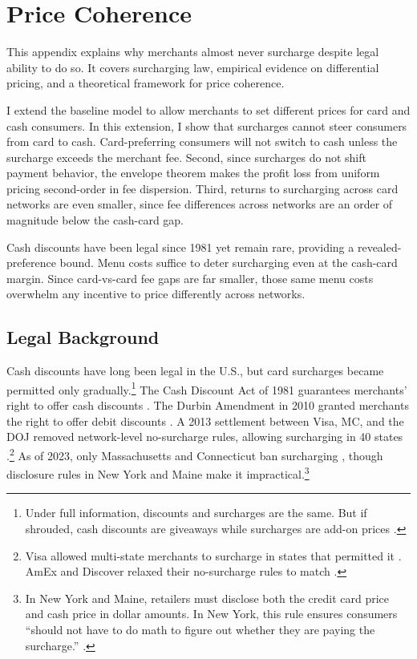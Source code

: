 \documentclass[main.tex]{subfiles}
\begin{document}
\section{Price Coherence}
\label{sec:oa-price-coherence}

This appendix explains why merchants almost never surcharge despite legal ability to do so.
It covers surcharging law, empirical evidence on differential pricing, and a theoretical framework for price coherence.

I extend the baseline model to allow merchants to set different prices for card and cash consumers.
In this extension, I show that surcharges cannot steer consumers from card to cash.
Card-preferring consumers will not switch to cash unless the surcharge exceeds the merchant fee.
Second, since surcharges do not shift payment behavior, the envelope theorem makes the profit loss from uniform pricing second-order in fee dispersion.
Third, returns to surcharging across card networks are even smaller, since fee differences across networks are an order of magnitude below the cash-card gap.

Cash discounts have been legal since 1981 yet remain rare, providing a revealed-preference bound.
Menu costs suffice to deter surcharging even at the cash-card margin.
Since card-vs-card fee gaps are far smaller, those same menu costs overwhelm any incentive to price differently across networks.

\subsection{Legal Background}
\label{subsec:oa-surcharging-history}

Cash discounts have long been legal in the U.S., but card surcharges became permitted only gradually.\footnote{Under full information, discounts and surcharges are the same. But if shrouded, cash discounts are giveaways while surcharges are add-on prices \parencite{Bourguignon.etal2019}.}
The Cash Discount Act of 1981 guarantees merchants' right to offer cash discounts \parencite{Chakravorti.Shah2001, Levitin2005, Prager.etal2009}.
The Durbin Amendment in 2010 granted merchants the right to offer debit discounts \parencite{Schuh.etal2011, Briglevics.Shy2014}.
A 2013 settlement between Visa, MC, and the DOJ removed network-level no-surcharge rules, allowing surcharging in 40 states \parencite{Blakeley.Fagan2015}.\footnote{Visa allowed multi-state merchants to surcharge in states that permitted it \parencite{Visa2013}.
AmEx and Discover relaxed their no-surcharge rules to match \parencite{Merchant2016}.}
As of 2023, only Massachusetts and Connecticut ban surcharging \parencite{CardX2023}, though disclosure rules in New York and Maine make it impractical.\footnote{In New York and Maine, retailers must disclose both the credit card price and cash price in dollar amounts.
In New York, this rule ensures consumers ``should not have to do math to figure out whether they are paying the surcharge.'' \parencite{Westchester2019}.}
\end{document}
